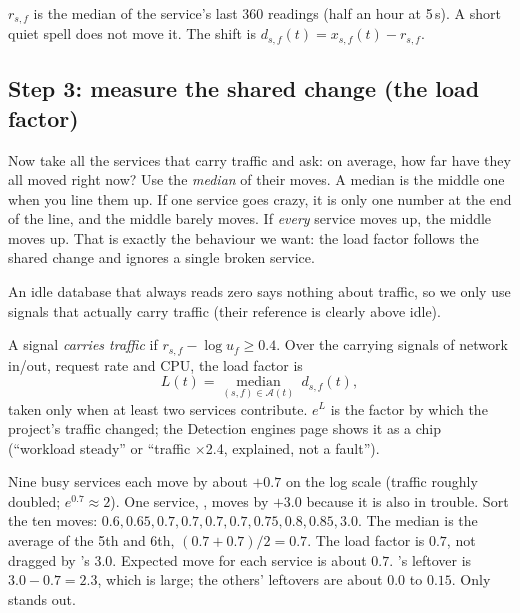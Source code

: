 \begin{techbox}
$r_{s,f}$ is the median of the service's last $360$ readings (half an hour at 5\,s). A short quiet spell does not move it. The shift is $d_{s,f}(t)=x_{s,f}(t)-r_{s,f}$.
\end{techbox}

\subsection{Step 3: measure the shared change (the load factor)}
\begin{simplebox}
Now take all the services that carry traffic and ask: on average, how far have they all moved right now? Use the \emph{median} of their moves. A median is the middle one when you line them up. If one service goes crazy, it is only one number at the end of the line, and the middle barely moves. If \emph{every} service moves up, the middle moves up. That is exactly the behaviour we want: the load factor follows the shared change and ignores a single broken service.

An idle database that always reads zero says nothing about traffic, so we only use signals that actually carry traffic (their reference is clearly above idle).
\end{simplebox}

\begin{techbox}
A signal \emph{carries traffic} if $r_{s,f}-\log u_f\ge 0.4$. Over the carrying signals of network in/out, request rate and CPU, the load factor is
\[
L(t)=\operatorname*{median}_{(s,f)\in\mathcal A(t)}\ d_{s,f}(t),
\]
taken only when at least two services contribute. $e^{L}$ is the factor by which the project's traffic changed; the Detection engines page shows it as a chip (``workload steady'' or ``traffic $\times$2.4, explained, not a fault'').
\end{techbox}

\begin{examplebox}
Nine busy services each move by about $+0.7$ on the log scale (traffic roughly doubled; $e^{0.7}\approx2$). One service, , moves by $+3.0$ because it is also in trouble. Sort the ten moves: $0.6,0.65,0.7,0.7,0.7,0.7,0.75,0.8,0.85,3.0$. The median is the average of the 5th and 6th, $(0.7+0.7)/2=0.7$. The load factor is $0.7$, not dragged by 's $3.0$. Expected move for each service is about $0.7$. 's leftover is $3.0-0.7=2.3$, which is large; the others' leftovers are about $0.0$ to $0.15$. Only  stands out.
\end{examplebox}


